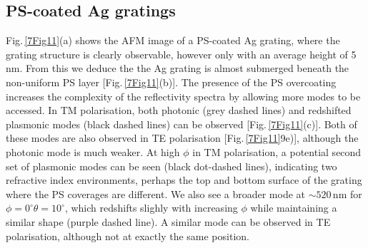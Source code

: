 \subsection{PS-coated Ag gratings}
Fig.\,\ref{7Fig11}(a) shows the AFM image of a PS-coated Ag grating, where the grating structure is clearly observable, however only with an average height of 5\,nm. From this we deduce the the Ag grating is almost submerged beneath the non-uniform PS layer [Fig.\,\ref{7Fig11}(b)]. The presence of the PS overcoating increases the complexity of the reflectivity spectra by allowing more modes to be accessed. In TM polarisation, both photonic (grey dashed lines) and redshifted plasmonic modes (black dashed lines) can be observed [Fig.\,\ref{7Fig11}(c)]. Both of these modes are also observed in TE polarisation [Fig.\,\ref{7Fig11}9e)], although the photonic mode is much weaker. At high $\phi$ in TM polarisation, a potential second set of plasmonic modes can be seen (black dot-dashed lines), indicating two refractive index environments, perhaps the top and bottom surface of the grating where the PS coverages are different. We also see a broader mode at $\sim520$\,nm for $\phi=0^{\circ} \theta=10^{\circ}$, which redshifts slighly with increasing $\phi$ while maintaining a similar shape (purple dashed line). A similar mode can be observed in TE polarisation, although not at exactly the same position.
